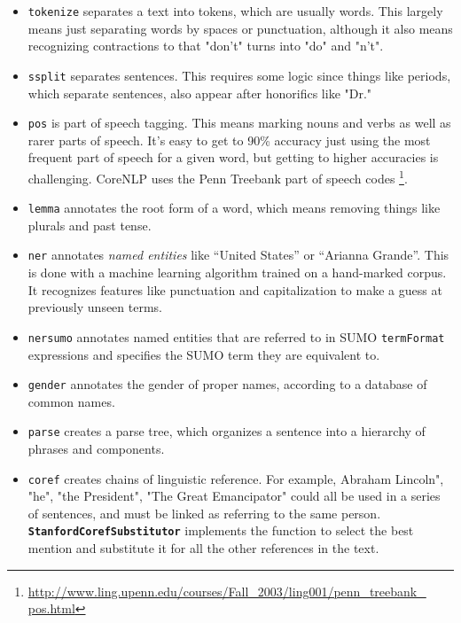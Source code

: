 \documentclass{book}
\newcommand{\tsumo}[1]{{\small \textbf{\texttt{#1}}}}
\begin{document}
\begin{itemize}

\item \texttt{tokenize} separates a text into tokens, which are usually words.
This largely means just separating words by spaces or punctuation, although it
also means recognizing contractions to that "don't" turns into "do" and "n't".

\item \texttt{ssplit} separates sentences.  This requires some logic since things
like periods, which separate sentences, also appear after honorifics like "Dr."

\item \texttt{pos} is part of speech tagging.  This means marking nouns and
verbs as well as rarer parts of speech.  It's easy to get to 90\% accuracy just
using the most frequent part of speech for a given word, but getting to higher
accuracies is challenging.  CoreNLP uses the Penn Treebank part of speech codes
\footnote{\url{http://www.ling.upenn.edu/courses/Fall_2003/ling001/penn_treebank_
pos.html}}.

\item \texttt{lemma} annotates the root form of a word, which means removing
things like plurals and past tense.

\item \texttt{ner} annotates \textit{named entities} like ``United States'' or
``Arianna Grande''.  This is done with a machine learning algorithm trained on
a hand-marked corpus.  It recognizes features like punctuation and capitalization
to make a guess at previously unseen terms.

\item \texttt{nersumo} annotates named entities that are referred to in SUMO
\texttt{termFormat} expressions and specifies the SUMO term they are equivalent
to.

\item \texttt{gender} annotates the gender of proper names, according to a
database of common names.

\item \texttt{parse} creates a parse tree, which organizes a sentence into
a hierarchy of phrases and components.

\item \texttt{coref} creates chains of linguistic reference.  For example,
Abraham Lincoln", "he", "the President", "The Great Emancipator" could all be
used in a series of sentences, and must be linked as referring to the same
person. \tsumo{StanfordCorefSubstitutor}
implements the function to select the best mention and substitute it for
all the other references in the text.


\end{itemize}
\end{document}
